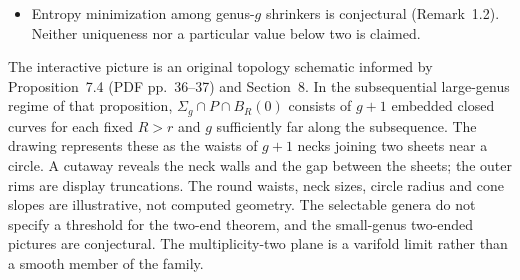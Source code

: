 \begin{example}
\begin{itemize}
concerns weak continuation beyond that singular time.
\item Entropy minimization among genus-$g$ shrinkers is conjectural
(Remark~1.2). Neither uniqueness nor a particular value below two is
claimed.
\end{itemize}
The interactive picture is an original topology schematic informed by
Proposition~7.4 (PDF pp.~36--37) and Section~8. In the subsequential
large-genus regime of that proposition, $\Sigma_g\cap P\cap B_R(0)$
consists of $g+1$ embedded closed curves for each fixed $R>r$ and
$g$ sufficiently far along the subsequence. The drawing represents these
as the waists of $g+1$ necks joining two sheets near a circle. A cutaway
reveals the neck walls and the gap between the sheets; the outer rims
are display truncations. The round waists, neck sizes, circle radius and
cone slopes are illustrative, not computed geometry. The selectable
genera do not specify a threshold for the two-end theorem, and the
small-genus two-ended pictures are conjectural. The multiplicity-two
plane is a varifold limit rather than a smooth member of the family.
\end{example}

